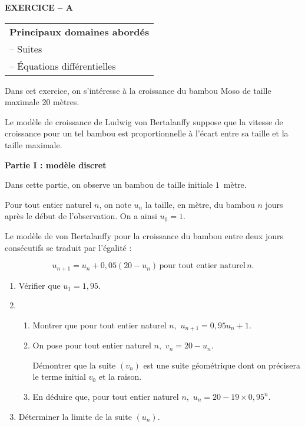 \textbf{EXERCICE -- A}

\medskip

\begin{tabular}{|l|}\hline
\textbf{Principaux domaines abordés}\\
-- Suites\\
-- Équations différentielles\\ \hline
\end{tabular}

\medskip

Dans cet exercice, on s'intéresse à la croissance du bambou Moso de taille maximale 20 mètres. 

Le modèle de croissance de Ludwig von Bertalanffy suppose que la vitesse de croissance pour un tel bambou est proportionnelle à l'écart entre sa taille et la taille maximale.

\bigskip

\textbf{Partie I : modèle discret}

\medskip

Dans cette partie, on observe un bambou de taille initiale $1$~mètre.

Pour tout entier naturel $n$, on note $u_n$ la taille, en mètre, du bambou $n$ jours après le début de l'observation. On a ainsi $u_0 = 1$.

Le modèle de von Bertalanffy pour la croissance du bambou entre deux jours consécutifs se traduit par l'égalité :

\[u_{n+1} = u_n + 0,05\left(20 - u_n\right)\,  \text{pour tout entier naturel}\,  n.\]

\medskip

\begin{enumerate}
\item Vérifier que $u_1 = 1,95$.
\item 
	\begin{enumerate}
		\item Montrer que pour tout entier naturel $n$,\,  $u_{n+1} = 0,95u_n + 1$.
		\item On pose pour tout entier naturel $n$,\,  $v_n = 20 - u_n$. 
		
Démontrer que la suite $\left(v_n\right)$ est une suite géométrique dont on précisera le terme initial $v_0$ et la raison.
		\item En déduire que, pour tout entier naturel $n$,\,  $u_n = 20 - 19 \times 0,95^n$.
	\end{enumerate}
\item Déterminer la limite de la suite $\left(u_n\right)$.
\end{enumerate}

